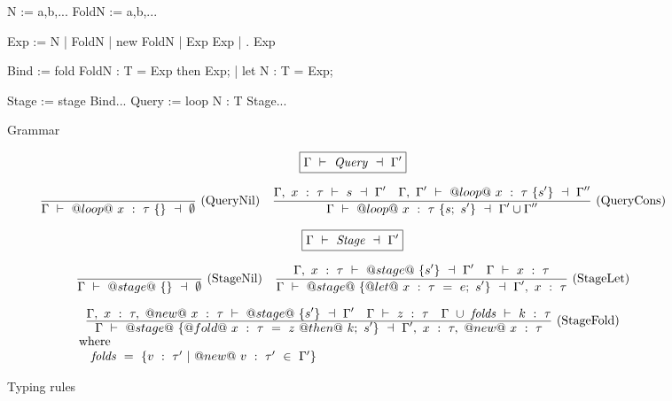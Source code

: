 \begin{figure}

\begin{code}
N     := a,b,...
FoldN := a,b,...

Exp   := N
       | FoldN  | new FoldN
       | Exp Exp
       | \N. Exp

Bind  := fold FoldN : T = Exp then Exp;
       | let  N     : T = Exp;

Stage := stage { Bind...  }
Query := loop N : T { Stage... }

\end{code}


\caption{Grammar}
\label{fig:grammar}
\end{figure}


\newcommand\TypecheckX[3]
{                   #1
        ~\vdash~    #2~:~#3
}

\newcommand\TypecheckS[3]
{                   #1
        ~\vdash~    #2~\dashv~#3
}


\begin{figure*}

$$
\boxed{\TypecheckS{\Gamma}{\mi{Query}}{\Gamma'}}
$$

$$
\ruleAx
{
  \TypecheckS{\Gamma}{@loop@~x~:~\tau~\{\}}{\emptyset}
}{QueryNil}
\ruleIN
{
  \TypecheckS{\Gamma,~x~:~\tau}{s}{\Gamma'}
  \quad
  \TypecheckS{\Gamma,~\Gamma'}{@loop@~x~:~\tau~\{s'\}}{\Gamma''}
}{
  \TypecheckS{\Gamma}{@loop@~x~:~\tau~\{s;~s'\}}{\Gamma' \cup \Gamma''}
}{QueryCons}
$$



$$
\boxed{\TypecheckS{\Gamma}{\mi{Stage}}{\Gamma'}}
$$

$$
\ruleAx
{
  \TypecheckS{\Gamma}{@stage@~\{\}}{\emptyset}
}{StageNil}
\ruleIN
{
  \TypecheckS{\Gamma,~x~:~\tau}{@stage@~\{s'\}}{\Gamma'}
  \quad
  \TypecheckX{\Gamma}{x}{\tau}
}
{
  \TypecheckS{\Gamma}{@stage@~\{@let@~x~:~\tau~=~e;~s'\}}{\Gamma',~x~:~\tau}
}{StageLet}
$$

$$
\begin{array}{l}

\ruleIN
{
  \TypecheckS{\Gamma,~x~:~\tau,~@new@~x~:~\tau}{@stage@~\{s'\}}{\Gamma'}
  
  \quad
  \TypecheckX{\Gamma}{z}{\tau}
  \quad
  \TypecheckX{\Gamma~\cup~\mi{folds}}{k}{\tau}
}
{
  \TypecheckS{\Gamma}{@stage@~\{@fold@~x~:~\tau~=~z~@then@~k;~s'\}}{\Gamma',~x~:~\tau,~@new@~x~:~\tau}
}{StageFold}

  \\
  \mbox{where} \\
  \quad
  \mi{folds}~=~\{v~:~\tau'~|~@new@~v~:~\tau'~\in~\Gamma'\}
  \end{array}
$$


\caption{Typing rules}
\label{fig:typing}
\end{figure*}


